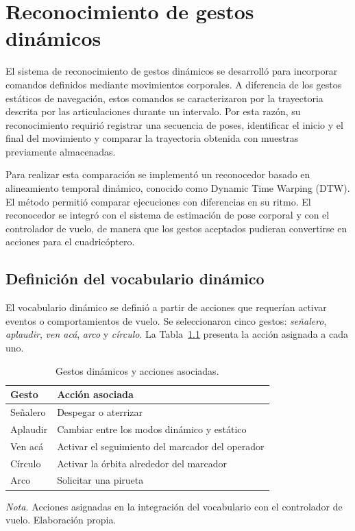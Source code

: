 \chapter{Reconocimiento de gestos dinámicos}

El sistema de reconocimiento de gestos dinámicos se desarrolló para incorporar comandos definidos mediante movimientos corporales. A diferencia de los gestos estáticos de navegación, estos comandos se caracterizaron por la trayectoria descrita por las articulaciones durante un intervalo. Por esta razón, su reconocimiento requirió registrar una secuencia de poses, identificar el inicio y el final del movimiento y comparar la trayectoria obtenida con muestras previamente almacenadas.

Para realizar esta comparación se implementó un reconocedor basado en alineamiento temporal dinámico, conocido como Dynamic Time Warping (DTW). El método permitió comparar ejecuciones con diferencias en su ritmo. El reconocedor se integró con el sistema de estimación de pose corporal y con el controlador de vuelo, de manera que los gestos aceptados pudieran convertirse en acciones para el cuadricóptero.

\section{Definición del vocabulario dinámico}

El vocabulario dinámico se definió a partir de acciones que requerían activar eventos o comportamientos de vuelo. Se seleccionaron cinco gestos: \textit{señalero}, \textit{aplaudir}, \textit{ven acá}, \textit{arco} y \textit{círculo}. La Tabla~\ref{tab:drive_01} presenta la acción asignada a cada uno.

\begin{table}[htbp]
    \centering
    \caption{Gestos dinámicos y acciones asociadas.}
    \label{tab:drive_01}
    \begin{tabular}{|p{}|p{}|}
        \hline
        Gesto & Acción asociada \\
        \hline
        Señalero & Despegar o aterrizar \\
        Aplaudir & Cambiar entre los modos dinámico y estático \\
        Ven acá & Activar el seguimiento del marcador del operador \\
        Círculo & Activar la órbita alrededor del marcador \\
        Arco & Solicitar una pirueta \\
        \hline
    \end{tabular}

    \begin{minipage}{0.92\textwidth}
        \footnotesize
        \textit{Nota.} Acciones asignadas en la integración del vocabulario con el controlador de vuelo. Elaboración propia.
    \end{minipage}
\end{table}

